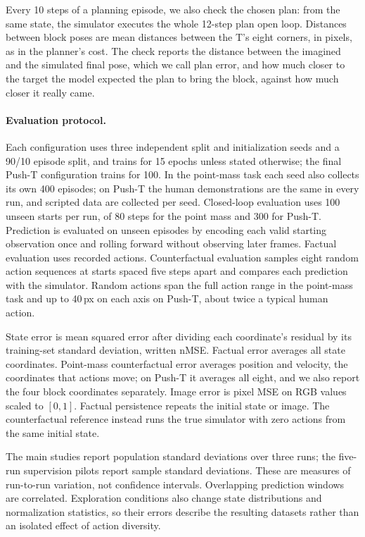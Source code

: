 \documentclass[11pt]{article}
\begin{document}
Every 10 steps of a planning episode, we also check the chosen plan: from the same state, the simulator executes the whole 12-step plan open loop. Distances between block poses are mean distances between the T's eight corners, in pixels, as in the planner's cost. The check reports the distance between the imagined and the simulated final pose, which we call plan error, and how much closer to the target the model expected the plan to bring the block, against how much closer it really came.

\paragraph{Evaluation protocol.} Each configuration uses three independent split and initialization seeds and a 90/10 episode split, and trains for 15 epochs unless stated otherwise; the final Push-T configuration trains for 100. In the point-mass task each seed also collects its own 400 episodes; on Push-T the human demonstrations are the same in every run, and scripted data are collected per seed. Closed-loop evaluation uses 100 unseen starts per run, of 80 steps for the point mass and 300 for Push-T. Prediction is evaluated on unseen episodes by encoding each valid starting observation once and rolling forward without observing later frames. Factual evaluation uses recorded actions. Counterfactual evaluation samples eight random action sequences at starts spaced five steps apart and compares each prediction with the simulator. Random actions span the full action range in the point-mass task and up to 40\,px on each axis on Push-T, about twice a typical human action.

State error is mean squared error after dividing each coordinate's residual by its training-set standard deviation, written nMSE. Factual error averages all state coordinates. Point-mass counterfactual error averages position and velocity, the coordinates that actions move; on Push-T it averages all eight, and we also report the four block coordinates separately. Image error is pixel MSE on RGB values scaled to $[0,1]$. Factual persistence repeats the initial state or image. The counterfactual reference instead runs the true simulator with zero actions from the same initial state.

The main studies report population standard deviations over three runs; the five-run supervision pilots report sample standard deviations. These are measures of run-to-run variation, not confidence intervals. Overlapping prediction windows are correlated. Exploration conditions also change state distributions and normalization statistics, so their errors describe the resulting datasets rather than an isolated effect of action diversity.
\end{document}
